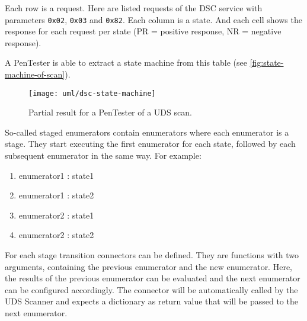 Each row is a request. Here are listed requests of the DSC service with parameters \texttt{0x02}, \texttt{0x03} and \texttt{0x82}. Each column is a state. And each cell shows the response for each request per state (PR = positive response, NR = negative response).

A PenTester is able to extract a state machine from this table (see \autoref{fig:state-machine-of-scan}).

\begin{figure}[H]
    \centering
    \texttt{[image: uml/dsc-state-machine]}
    \caption{Partial result for a PenTester of a UDS scan.}
    \label{fig:state-machine-of-scan}
\end{figure}

So-called staged enumerators contain enumerators where each enumerator is a stage. They start executing the first enumerator for each state, followed by each subsequent enumerator in the same way. For example:
\begin{enumerate}
    \item enumerator1 : state1
    \item enumerator1 : state2
    \item enumerator2 : state1
    \item enumerator2 : state2
\end{enumerate}

For each stage transition connectors can be defined. They are functions with two arguments, containing the previous enumerator and the new enumerator. Here, the results of the previous enumerator can be evaluated and the next enumerator can be configured accordingly. The connector will be automatically called by the UDS Scanner and expects a dictionary as return value that will be passed to the next enumerator. 


